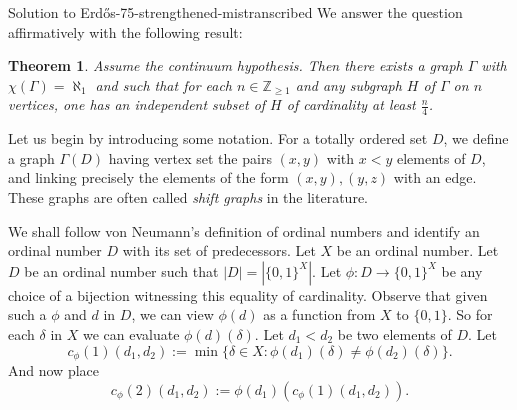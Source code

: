 \documentclass{article}
\theoremstyle{plain}
\newtheorem{theorem}{Theorem}
\theoremstyle{definition}
\begin{document}
\begin{solution}{Solution to Erd\H{o}s-75-strengthened-mistranscribed} We answer the question affirmatively with the following result:
\begin{theorem} \label{thm: Erdos-75 with linear demand}
Assume the continuum hypothesis. Then there exists a graph $\Gamma$ with $\chi(\Gamma)=\aleph_1$ and such that for each $n \in \mathbb{Z}_{\geq 1}$ and any subgraph $H$ of $\Gamma$ on $n$ vertices, one has an independent subset of $H$ of cardinality at least $\frac{n}{4}$.
\end{theorem}
Let us begin by introducing some notation. For a totally ordered set $D$, we define a graph $\Gamma(D)$ having vertex set the pairs $(x,y)$ with $x<y$ elements of $D$, and linking precisely the elements of the form $(x,y),(y,z)$ with an edge. These graphs are often called \emph{shift graphs} in the literature.

We shall follow von Neumann's definition of ordinal numbers and identify an ordinal number $D$ with its set of predecessors. Let $X$ be an ordinal number. Let $D$ be an ordinal number such that $|D|=|\{0,1\}^X|$. Let $\phi:D \to \{0,1\}^X$ be any choice of a bijection witnessing this equality of cardinality. Observe that given such a $\phi$ and $d$ in $D$, we can view $\phi(d)$ as a function from $X$ to $\{0,1\}$. So for each $\delta$ in $X$ we can evaluate $\phi(d)(\delta)$. Let $d_1<d_2$ be two elements of $D$. Let 
$$c_{\phi}(1)(d_1,d_2):=\min\{\delta \in X: \phi(d_1)(\delta) \neq \phi(d_2)(\delta)\}.
$$
And now place
$$c_{\phi}(2)(d_1,d_2):=\phi(d_1)(c_{\phi}(1)(d_1,d_2)).
$$



\end{solution}
\end{document}
